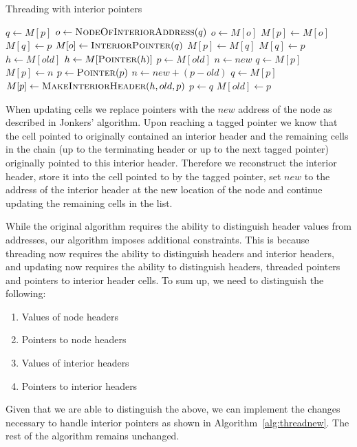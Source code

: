 \documentclass[10pt,a4paper,final,twocolumn]{article}
\begin{document}
\begin{algorithm}[htb!]
  \caption{Threading with interior pointers}
  \label{alg:threadnew}
  {\footnotesize\begin{algorithmic}[0]
      \State $q \gets M[p]$
        \State $o \gets \Call{NodeOfInteriorAddress}{q}$
          \State $o \gets M[o]$
        \EndWhile
        \State $M[p] \gets M[o]$
        \State $M[q] \gets p$
        \State $M[o] \gets \Call{InteriorPointer}{q}$
      \Else
        \State $M[p] \gets M[q]$
        \State $M[q] \gets p$
      \EndIf
    \EndProcedure
    \\
      \State $h \gets M[old]$
        \State $h \gets M[\Call{Pointer}{h}]$
      \EndWhile
      \State $p \gets M[old]$
      \State $n \gets new$
          \State $q \gets M[p]$
          \State $M[p] \gets n$
        \Else{}
          \State $p \gets \Call{Pointer}{p}$
          \State $n \gets new + (p - old)$
          \State $q \gets M[p]$
          \State $M[p] \gets \Call{MakeInteriorHeader}{h, old, p}$
        \EndIf
        \State $p \gets q$
      \EndWhile
      \State $M[old] \gets p$
    \EndProcedure
  \end{algorithmic}}
\end{algorithm}

When updating cells we replace pointers with the $new$ address of the node as described in
Jonkers' algorithm. Upon reaching a tagged pointer we know that the cell pointed to originally
contained an interior header and the remaining cells in the chain (up to the terminating header or up to the
next tagged pointer) originally pointed to this interior header. Therefore we reconstruct
the interior header, store it into the cell pointed to by the tagged pointer, set $new$ to the
address of the interior header at the new location of the node and continue updating the remaining 
cells in the list.

While the original algorithm requires the ability to distinguish header values from addresses, our
algorithm imposes additional constraints. This is because threading now requires the ability to
distinguish headers and interior headers, and updating now requires the ability to distinguish
headers, threaded pointers and pointers to interior header cells. To sum up, we need to distinguish
the following:
\begin{enumerate}
\item Values of node headers
\item Pointers to node headers
\item Values of interior headers
\item Pointers to interior headers
\end{enumerate}
Given that we are able to distinguish the above, we can implement the changes necessary to handle
interior pointers as shown in Algorithm~\ref{alg:threadnew}. The rest of the algorithm remains
unchanged.
\end{document}
